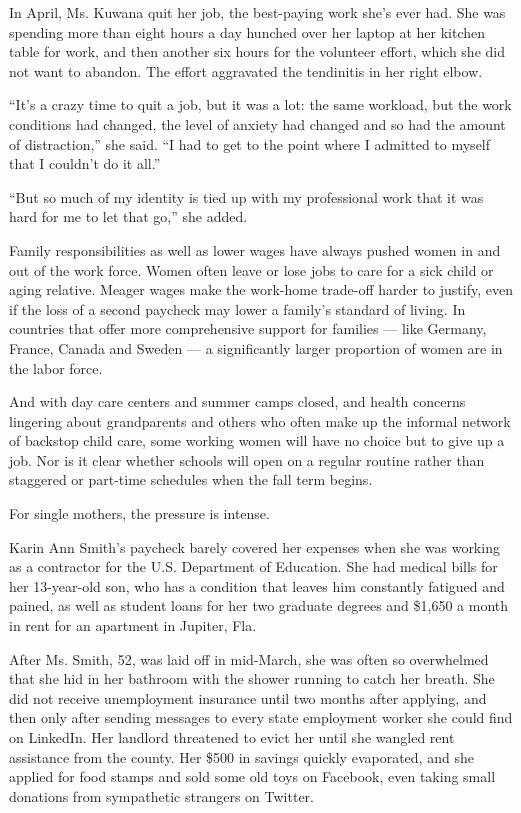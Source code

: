 In April, Ms. Kuwana quit her job, the best-paying work she's ever had.
She was spending more than eight hours a day hunched over her laptop at
her kitchen table for work, and then another six hours for the volunteer
effort, which she did not want to abandon. The effort aggravated the
tendinitis in her right elbow.

``It's a crazy time to quit a job, but it was a lot: the same workload,
but the work conditions had changed, the level of anxiety had changed
and so had the amount of distraction,'' she said. ``I had to get to the
point where I admitted to myself that I couldn't do it all.''

``But so much of my identity is tied up with my professional work that
it was hard for me to let that go,'' she added.

Family responsibilities as well as lower wages have always pushed women
in and out of the work force. Women often leave or lose jobs to care for
a sick child or aging relative. Meager wages make the work-home
trade-off harder to justify, even if the loss of a second paycheck may
lower a family's standard of living. In countries that offer more
comprehensive support for families --- like Germany, France, Canada and
Sweden --- a significantly larger proportion of women are in the labor
force.

And with day care centers and summer camps closed, and health concerns
lingering about grandparents and others who often make up the informal
network of backstop child care, some working women will have no choice
but to give up a job. Nor is it clear whether schools will open on a
regular routine rather than staggered or part-time schedules when the
fall term begins.

For single mothers, the pressure is intense.

Karin Ann Smith's paycheck barely covered her expenses when she was
working as a contractor for the U.S. Department of Education. She had
medical bills for her 13-year-old son, who has a condition that leaves
him constantly fatigued and pained, as well as student loans for her two
graduate degrees and \$1,650 a month in rent for an apartment in
Jupiter, Fla.

After Ms. Smith, 52, was laid off in mid-March, she was often so
overwhelmed that she hid in her bathroom with the shower running to
catch her breath. She did not receive unemployment insurance until two
months after applying, and then only after sending messages to every
state employment worker she could find on LinkedIn. Her landlord
threatened to evict her until she wangled rent assistance from the
county. Her \$500 in savings quickly evaporated, and she applied for
food stamps and sold some old toys on Facebook, even taking small
donations from sympathetic strangers on Twitter.

